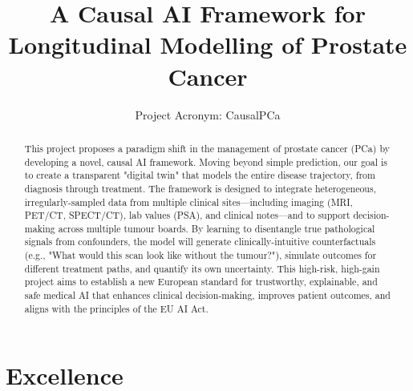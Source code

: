 \documentclass[11pt, a4paper]{article}
\title{A Causal AI Framework for Longitudinal Modelling of Prostate Cancer}
\author{Project Acronym: CausalPCa}
\date{}
\begin{document}
\maketitle

\begin{abstract}
This project proposes a paradigm shift in the management of prostate cancer (PCa) by developing a novel, causal AI framework. Moving beyond simple prediction, our goal is to create a transparent "digital twin" that models the entire disease trajectory, from diagnosis through treatment. The framework is designed to integrate heterogeneous, irregularly-sampled data from multiple clinical sites—including imaging (MRI, PET/CT, SPECT/CT), lab values (PSA), and clinical notes—and to support decision-making across multiple tumour boards. By learning to disentangle true pathological signals from confounders, the model will generate clinically-intuitive counterfactuals (e.g., "What would this scan look like without the tumour?"), simulate outcomes for different treatment paths, and quantify its own uncertainty. This high-risk, high-gain project aims to establish a new European standard for trustworthy, explainable, and safe medical AI that enhances clinical decision-making, improves patient outcomes, and aligns with the principles of the EU AI Act.
\end{abstract}

\section{Excellence}
\end{document}

